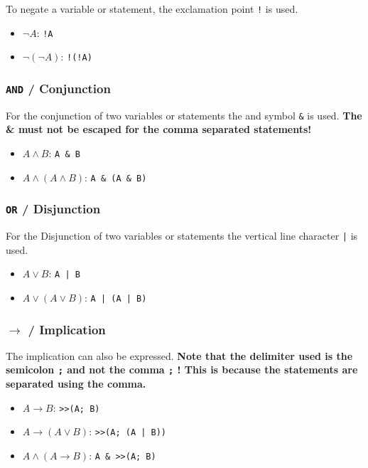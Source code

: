 \documentclass[a4paper]{article}
\begin{document}
	To negate a variable or statement, the exclamation point \texttt{!} is used.
	\begin{itemize}
		\item $\lnot A$:  \texttt{!A}
		\item $\lnot (\lnot A)$: \texttt{!(!A)} 
	\end{itemize} 

	\subsubsection{\texttt{AND} / Conjunction}

	For the conjunction of two variables or statements the and symbol \texttt{\&} is used. \textbf{The \& must not be escaped for the comma separated statements!}
	\begin{itemize}
		\item $A \land B$:  \texttt{A \& B}
		\item $A \land (A \land B)$: \texttt{A \& (A \& B)} 
	\end{itemize} 

	\subsubsection{\texttt{OR} / Disjunction}

	For the Disjunction of two variables or statements the vertical line character \texttt{|} is used. 

	\begin{itemize}
		\item $A \lor B$:  \texttt{A | B}
		\item $A \lor (A \lor B)$: \texttt{A | (A | B)} 
	\end{itemize}
	
	\subsubsection{$\rightarrow$ / Implication}

	The implication can also be expressed. \textbf{Note that the delimiter used is the semicolon \texttt{;} and not the comma \texttt{;} ! This is because the statements are separated using the comma.}

	\begin{itemize}
		\item $A \rightarrow B$:  \texttt{>>(A; B)}
		\item $A \rightarrow (A \lor B)$: \texttt{>>(A; (A | B))}
		\item $A \land (A \rightarrow B)$: \texttt{A \& >>(A; B)} 
	\end{itemize}
\end{document}
